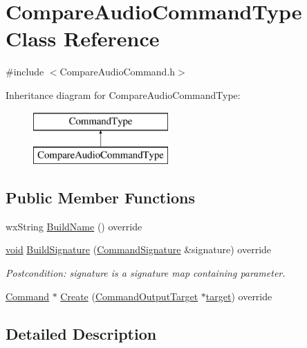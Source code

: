 \hypertarget{class_compare_audio_command_type}{}\section{Compare\+Audio\+Command\+Type Class Reference}
\label{class_compare_audio_command_type}


{\ttfamily \#include $<$Compare\+Audio\+Command.\+h$>$}

Inheritance diagram for Compare\+Audio\+Command\+Type\+:\begin{figure}[H]
\begin{center}
\leavevmode
\includegraphics[height=2.000000cm]{class_compare_audio_command_type}
\end{center}
\end{figure}
\subsection*{Public Member Functions}
\begin{DoxyCompactItemize}
\item 
wx\+String \hyperlink{class_compare_audio_command_type_a49aa3bf8fc97a4515bb5e6c5c41775eb}{Build\+Name} () override
\item 
\hyperlink{sound_8c_ae35f5844602719cf66324f4de2a658b3}{void} \hyperlink{class_compare_audio_command_type_a960cbed3e132c245be8628496402dd73}{Build\+Signature} (\hyperlink{class_command_signature}{Command\+Signature} \&signature) override
\begin{DoxyCompactList}\small\item\em Postcondition\+: signature is a \textquotesingle{}signature\textquotesingle{} map containing parameter. \end{DoxyCompactList}\item 
\hyperlink{class_command}{Command} $\ast$ \hyperlink{class_compare_audio_command_type_ac9a715ddf1b8c6c9e238e3dbd812f15c}{Create} (\hyperlink{class_command_output_target}{Command\+Output\+Target} $\ast$\hyperlink{lib_2expat_8h_a15a257516a87decb971420e718853137}{target}) override
\end{DoxyCompactItemize}


\subsection{Detailed Description}


